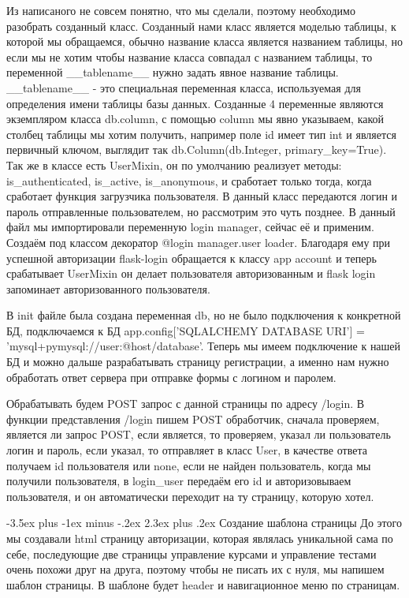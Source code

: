 \documentclass[12pt, oldlfont, amsfonts]{report}
\makeatletter
\renewcommand{\section}{\@startsection{section}{1}{0pt}%
                                {-3.5ex plus -1ex minus -.2ex}%
                                {2.3ex plus .2ex}%
{\centering\hyphenpenalty=10000\normalfont\Large\bfseries}}
\makeatother
\begin{document}
Из написаного не совсем понятно, что мы сделали, поэтому необходимо разобрать созданный класс. Созданный нами класс является моделью таблицы, к которой мы обращаемся, обычно название класса является названием таблицы, но если мы не хотим чтобы название класса совпадал с названием таблицы, то переменной { \_\_tablename\_\_} нужно задать явное название таблицы. { \_\_tablename\_\_} - это специальная переменная класса, используемая для определения имени таблицы базы данных. Созданные  4 переменные являются экземпляром класса { db.column}, с помощью { column} мы явно указываем, какой столбец таблицы мы хотим получить, например поле { id} имеет тип { int} и является первичный ключом, выглядит так { db.Column(db.Integer, primary\_key=True)}. Так же в классе есть { UserMixin}, он по умолчанию реализует методы: is\_authenticated, is\_active, is\_anonymous, и сработает только тогда, когда сработает функция загрузчика пользователя. В данный класс передаются { логин} и { пароль} отправленные пользователем, но рассмотрим это чуть позднее. В данный файл мы импортировали переменную { login manager}, сейчас её и применим. Создаём под классом декоратор { @login manager.user loader}. Благодаря ему при успешной авторизации {flask-login} обращается к классу { app account} и теперь срабатывает {UserMixin} он делает пользователя авторизованным и { flask login} запоминает авторизованного пользователя.

В { init} файле была создана переменная { db}, но не было подключения к конкретной БД, подключаемся к БД { app.config['SQLALCHEMY DATABASE URI'] = 'mysql+pymysql://user:@host/database'}. Теперь мы имеем подключение к нашей БД и можно дальше разрабатывать страницу регистрации, а именно нам нужно обработать ответ сервера при отправке формы с логином и паролем. 

Обрабатывать будем { POST} запрос с данной страницы по адресу { /login}. В функции представления { /login} пишем { POST} обработчик, сначала проверяем, является ли запрос { POST}, если является, то проверяем, указал ли пользователь логин и пароль, если указал, то отправляет в класс { User}, в качестве ответа получаем id пользователя или none, если не найден пользователь, когда мы получили пользователя, в login\_user передаём его { id} и авторизовываем пользователя, и он автоматически переходит на ту страницу, которую хотел.



\section{Создание шаблона страницы}
До этого мы создавали html страницу авторизации, которая являлась уникальной сама по себе, последующие две страницы управление курсами и управление тестами очень похожи друг на друга, поэтому чтобы не писать их с нуля, мы напишем шаблон страницы. В шаблоне будет { header} и { навигационное меню по страницам}.
\end{document}
